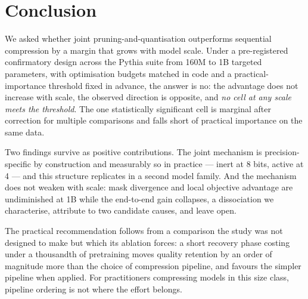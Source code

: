 \section{Conclusion}
\label{sec:conclusion}

We asked whether joint pruning-and-quantisation outperforms sequential compression by a
margin that grows with model scale. Under a pre-registered confirmatory design across the
Pythia suite from 160M to 1B targeted parameters, with optimisation budgets matched in code
and a practical-importance threshold fixed in advance, the answer is no: the advantage does
not increase with scale, the observed direction is opposite, and \emph{no cell at any scale
meets the threshold}. The one statistically significant cell is marginal after correction for
multiple comparisons and falls short of practical importance on the same data.

Two findings survive as positive contributions. The joint mechanism is precision-specific by
construction and measurably so in practice --- inert at 8 bits, active at 4 --- and this
structure replicates in a second model family. And the mechanism does not weaken with scale:
mask divergence and local objective advantage are undiminished at 1B while the end-to-end
gain collapses, a dissociation we characterise, attribute to two candidate causes, and leave
open.

The practical recommendation follows from a comparison the study was not designed to make but
which its ablation forces: a short recovery phase costing under a thousandth of pretraining
moves quality retention by an order of magnitude more than the choice of compression
pipeline, and favours the simpler pipeline when applied. For practitioners compressing models
in this size class, pipeline ordering is not where the effort belongs.
